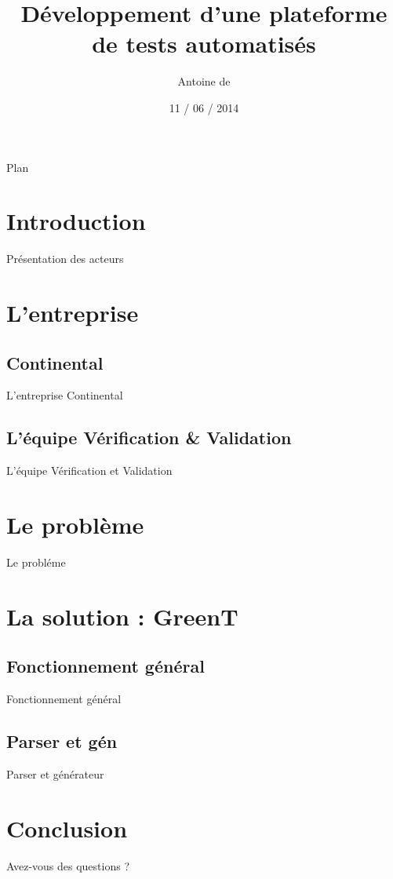 \documentclass{beamer}
\title[] %
{D\'eveloppement d'une plateforme de tests automatis\'es}
\subtitle {}
\author[Antoine de \bsc{Roquemaurel}] %
{Antoine de \bsc{Roquemaurel}}
\institute[] %
{
  Universit\'e Toulouse III -- Paul Sabatier \\
  L3 Informatique -- Parcours ISI
  \vspace{-10px}
}
\date[ ~ ~ ~ 11 / 06 / 2014] %
{11 / 06 / 2014}
\begin{document}
\begin{frame}
  \titlepage
\end{frame}
\begin{frame}{Plan}
	\tableofcontents
\end{frame}
\section*{Introduction}
\begin{frame}{Pr\'esentation des acteurs}
~
\end{frame}
\section{L'entreprise}
\subsection{Continental}
\begin{frame}{L'entreprise Continental}
\end{frame}
\subsection{L'\'equipe V\'erification \& Validation}
\begin{frame}{L'\'equipe V\'erification et Validation}
\end{frame}
\section{Le probl\`eme}
\begin{frame}{Le probl\'eme}
\end{frame}
\section{La solution : GreenT}
\subsection{Fonctionnement g\'en\'eral}
\begin{frame}{Fonctionnement g\'en\'eral}
\end{frame}
\subsection{Parser et g\'en\erateur}
\begin{frame}{Parser et g\'en\'erateur}
\end{frame}
\section*{Conclusion}
\begin{frame}
\end{frame}
\begin{frame}{Avez-vous des questions ?}
\end{frame}
\end{document}
